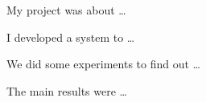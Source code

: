 My project was about \ldots

I developed a system to \ldots

We did some experiments to find out \ldots

The main results were \ldots